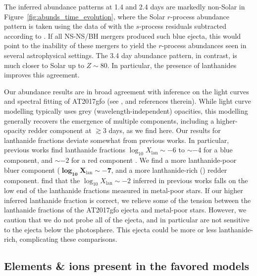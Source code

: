 \documentclass[twocolumn,twocolappendix]{aastex63}
\def\eg{{\it e.g.}}
\begin{document}
The inferred abundance patterns at 1.4 and 2.4 days are markedly non-Solar in Figure~\ref{fig:abunds_time_evolution}, where the Solar $r$-process abundance pattern is taken using the data of \cite{lodders09} with the $s$-process residuals subtracted according to \cite{bisterzo14}. If all NS-NS/BH mergers produced such blue ejecta, this would point to the inability of these mergers to yield the $r$-process abundances seen in several astrophysical settings. The 3.4 day abundance pattern, in contrast, is much closer to Solar up to $Z \sim 80$. In particular, the presence of lanthanides improves this agreement. 

Our abundance results are in broad agreement with inference on the light curves and spectral fitting of AT2017gfo (see \citealt{ji19}, and references therein). While light curve modelling typically uses grey (wavelength-independent) opacities, this modelling generally recovers the emergence of multiple components, including a higher-opacity redder component at $\gtrsim$3 days, as we find here. Our results for lanthanide fractions deviate somewhat from previous works. In particular, previous works find lanthanide fractions $\log_{10} X_{\mathrm{lan}} \sim -6$ to $\sim -4$ for a blue component, and $\sim -2$ for a red component \edit1{(\eg, \citealt{chornock17, kasen17})}. We find a more lanthanide-poor bluer component ($\mathbf{\log_{10} X_{\mathrm{lan}} \sim -7}$, and a more lanthanide-rich () redder component.  \cite{ji19}  find that the $\log_{10} X_{\mathrm{lan}} \sim -2$ inferred in previous works falls on the low end of the lanthanide fractions measured in metal-poor stars. If our higher inferred lanthanide fraction is correct, we relieve some of the tension between the lanthanide fractions of the AT2017gfo ejecta and metal-poor stars. However, we caution that we do not probe all of the ejecta, and in particular are not sensitive to the ejecta below the photosphere. This ejecta could be more or less lanthanide-rich, complicating these comparisons.




\subsection{Elements \& ions present in the favored models}\label{ssc:disco-elements}
\end{document}

